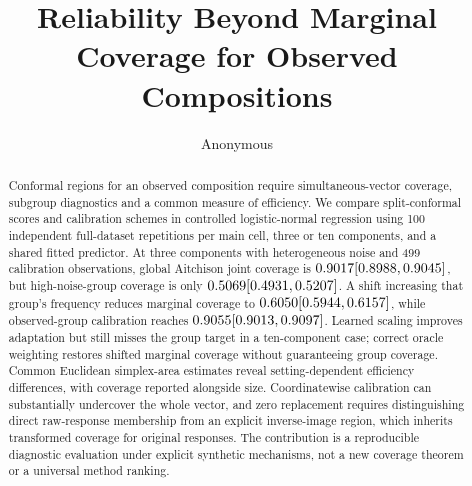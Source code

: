 \documentclass{article}
\title{Reliability Beyond Marginal Coverage for Observed Compositions}
\author{Anonymous}
\begin{document}
\maketitle
\begin{abstract}
Conformal regions for an observed composition require simultaneous-vector coverage, subgroup diagnostics and a common measure of efficiency. We compare split-conformal scores and calibration schemes in controlled logistic-normal regression using 100 independent full-dataset repetitions per main cell, three or ten components, and a shared fitted predictor. At three components with heterogeneous noise and 499 calibration observations, global Aitchison joint coverage is $0.9017 [0.8988, 0.9045]{}$, but high-noise-group coverage is only $0.5069 [0.4931, 0.5207]{}$. A shift increasing that group's frequency reduces marginal coverage to $0.6050 [0.5944, 0.6157]{}$, while observed-group calibration reaches $0.9055 [0.9013, 0.9097]{}$. Learned scaling improves adaptation but still misses the group target in a ten-component case; correct oracle weighting restores shifted marginal coverage without guaranteeing group coverage. Common Euclidean simplex-area estimates reveal setting-dependent efficiency differences, with coverage reported alongside size. Coordinatewise calibration can substantially undercover the whole vector, and zero replacement requires distinguishing direct raw-response membership from an explicit inverse-image region, which inherits transformed coverage for original responses. The contribution is a reproducible diagnostic evaluation under explicit synthetic mechanisms, not a new coverage theorem or a universal method ranking.
\end{abstract}





\clearpage


\clearpage
\appendix




\clearpage

\clearpage

\end{document}
